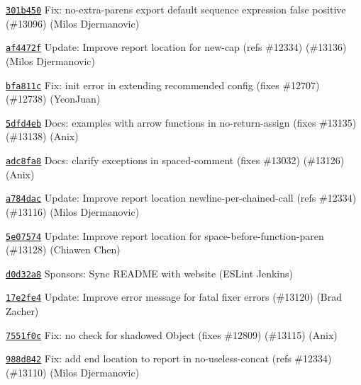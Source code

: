 \begin{DoxyItemize}
\item \href{https://github.com/eslint/eslint/commit/301b450ecd1985ae84d1915124f4638ab2a2e6de}{\texttt{ {\ttfamily 301b450}}} Fix\+: no-\/extra-\/parens export default sequence expression false positive (\#13096) (Milos Djermanovic)
\item \href{https://github.com/eslint/eslint/commit/af4472fed794b86e63730702e4b27294a4118d09}{\texttt{ {\ttfamily af4472f}}} Update\+: Improve report location for new-\/cap (refs \#12334) (\#13136) (Milos Djermanovic)
\item \href{https://github.com/eslint/eslint/commit/bfa811ceee801fe8ba212a5c879e13743146e909}{\texttt{ {\ttfamily bfa811c}}} Fix\+: init error in extending recommended config (fixes \#12707) (\#12738) (Yeon\+Juan)
\item \href{https://github.com/eslint/eslint/commit/5dfd4eb50d84077a57950f119e5de8976070e49a}{\texttt{ {\ttfamily 5dfd4eb}}} Docs\+: examples with arrow functions in no-\/return-\/assign (fixes \#13135) (\#13138) (Anix)
\item \href{https://github.com/eslint/eslint/commit/adc8fa88c9f223b984a3519ed159a055bf933b18}{\texttt{ {\ttfamily adc8fa8}}} Docs\+: clarify exceptions in spaced-\/comment (fixes \#13032) (\#13126) (Anix)
\item \href{https://github.com/eslint/eslint/commit/a784dac8bc26f31edbca869b16d6ad91bd4e5cc4}{\texttt{ {\ttfamily a784dac}}} Update\+: Improve report location newline-\/per-\/chained-\/call (refs \#12334) (\#13116) (Milos Djermanovic)
\item \href{https://github.com/eslint/eslint/commit/5e07574a91861fdcab6888b4c6829868030c3a39}{\texttt{ {\ttfamily 5e07574}}} Update\+: Improve report location for space-\/before-\/function-\/paren (\#13128) (Chiawen Chen)
\item \href{https://github.com/eslint/eslint/commit/d0d32a8c2a6c60c7e6e2d32a054e5987efd4c263}{\texttt{ {\ttfamily d0d32a8}}} Sponsors\+: Sync README with website (ESLint Jenkins)
\item \href{https://github.com/eslint/eslint/commit/17e2fe425168e675fe7607182615e50527eedf53}{\texttt{ {\ttfamily 17e2fe4}}} Update\+: Improve error message for fatal fixer errors (\#13120) (Brad Zacher)
\item \href{https://github.com/eslint/eslint/commit/7551f0c6fd12f0295cc7d6377bf1899c092e79d8}{\texttt{ {\ttfamily 7551f0c}}} Fix\+: no check for shadowed Object (fixes \#12809) (\#13115) (Anix)
\item \href{https://github.com/eslint/eslint/commit/988d8428811934943ce13b2d8b833d795ac2bb4a}{\texttt{ {\ttfamily 988d842}}} Fix\+: add end location to report in no-\/useless-\/concat (refs \#12334) (\#13110) (Milos Djermanovic)

\end{DoxyItemize}
